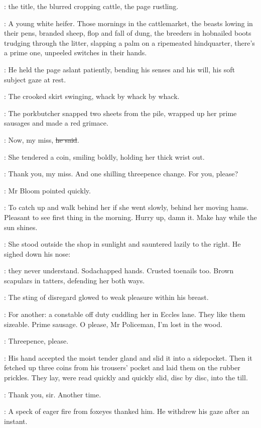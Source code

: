 :
the title,
the blurred cropping cattle,
the page rustling.

\BloomInt:
A young white heifer.
Those mornings in the cattlemarket,
the beasts lowing in their pens,
branded sheep,
flop and fall of dung,
the breeders in
hobnailed boots trudging through the litter,
slapping a palm on a ripemeated hindquarter,
there's a prime one,
unpeeled switches in their hands.

:
He held the page aslant patiently,
bending his senses and his will,
his soft subject gaze at rest.

\BloomInt:
The crooked skirt swinging,
whack by whack by whack.

:
The porkbutcher snapped two sheets from the pile,
wrapped up her prime sausages
and made a red grimace.

\Dlugacz:
Now, my miss,
\sout{he said}.

:
She tendered a coin, smiling boldly, holding her thick wrist out.

\Dlugacz:
Thank you, my miss.
And one shilling threepence change.
For you, please?

:
Mr Bloom pointed quickly.

\BloomInt:
To catch up and walk behind her if she went slowly,
behind her moving hams.
Pleasant to see first thing in the morning.
Hurry up, damn it.
Make hay while the sun shines.

:
She stood outside the shop in sunlight and sauntered lazily to the right.
He sighed down his nose:

\BloomInt:
they never understand.
Sodachapped hands.
Crusted toenails too.
Brown scapulars in tatters, defending her both ways.

:
The sting of disregard glowed to weak pleasure within his breast.

\BloomInt:
For another:
a constable off duty cuddling her in Eccles lane.
They like them sizeable.
Prime sausage.
O please, Mr Policeman, I'm lost in the wood.

\Dlugacz:
Threepence, please.

:
His hand accepted the moist tender gland and slid it into a sidepocket.
Then it fetched up three coins from his trousers' pocket
and laid them on the rubber prickles.
They lay, were read quickly and quickly slid,
disc by disc, into the till.

\Dlugacz:
Thank you, sir.
Another time.

:
A speck of eager fire from foxeyes thanked him.
He withdrew his gaze after an instant.

